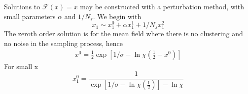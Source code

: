 \documentclass[aps,prl,twocolumn,showpacs,superscriptaddress,groupedaddress]{revtex4}
\begin{document}
Solutions to $\mathcal{F}(x)=x$ may be constructed with a perturbation method, with small parameters $\alpha$ and $1/N_s$. We begin with 
\begin{equation}
x_1 \sim x^0_1 + \alpha x^1_1 + 1/N_s x^2_1
\end{equation}
The zeroth order solution is for the mean field where there is no clustering and no noise in the sampling process, hence
\begin{align}
x^0  = \frac{1}{2}\exp{\left[ 1/\sigma -  \ln\chi  \left(\frac{1}{2}-x^0\right)\right]} 
\end{align}
For small x
\begin{equation}
x^0_1 = \frac{1}{\exp{\left[ 1/\sigma -  \ln\chi  \left(\frac{1}{2}\right)\right]}  - \ln\chi}
\end{equation}

%
%
%

\end{document}
